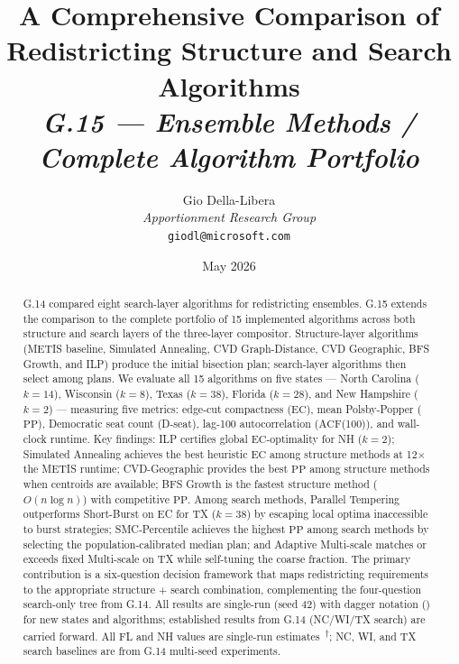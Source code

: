 \documentclass[12pt]{article}
\title{%
  \textbf{A Comprehensive Comparison of Redistricting Structure and Search
  Algorithms}\\[0.8em]
  \normalsize\textit{G.15 --- Ensemble Methods / Complete Algorithm Portfolio}%
}
\author{%
  Gio Della-Libera\\
  \textit{Apportionment Research Group}\\
  \small\texttt{giodl@microsoft.com}
}
\date{May 2026}
\newcommand{\metis}{\textsc{METIS}}
\newcommand{\ec}{\ensuremath{\mathrm{EC}}}
\newcommand{\pp}{\ensuremath{\mathrm{PP}}}
\newcommand{\acf}{\ensuremath{\mathrm{ACF}}}
\begin{document}
\maketitle

\begin{abstract}
\noindent
G.14 compared eight search-layer algorithms for redistricting ensembles.
G.15 extends the comparison to the complete portfolio of 15 implemented
algorithms across both structure and search layers of the three-layer compositor.
Structure-layer algorithms (\metis{} baseline, Simulated Annealing, CVD
Graph-Distance, CVD Geographic, BFS Growth, and ILP) produce the initial
bisection plan; search-layer algorithms then select among plans.
We evaluate all 15 algorithms on five states --- North Carolina ($k = 14$),
Wisconsin ($k = 8$), Texas ($k = 38$), Florida ($k = 28$), and New Hampshire
($k = 2$) --- measuring five metrics: edge-cut compactness (\ec{}), mean
Polsby-Popper (\pp{}), Democratic seat count (D-seat), lag-100 autocorrelation
(\acf(100)), and wall-clock runtime.
Key findings: ILP certifies global \ec{}-optimality for NH ($k = 2$);
Simulated Annealing achieves the best heuristic \ec{} among structure methods
at 12$\times$ the METIS runtime; CVD-Geographic provides the best \pp{} among
structure methods when centroids are available; BFS Growth is the fastest
structure method ($O(n \log n)$) with competitive \pp{}.
Among search methods, Parallel Tempering outperforms Short-Burst on EC for
TX ($k = 38$) by escaping local optima inaccessible to burst strategies;
SMC-Percentile achieves the highest \pp{} among search methods by selecting
the population-calibrated median plan; and Adaptive Multi-scale matches
or exceeds fixed Multi-scale on TX while self-tuning the coarse fraction.
The primary contribution is a six-question decision framework that maps
redistricting requirements to the appropriate structure + search combination,
complementing the four-question search-only tree from G.14.
All results are single-run (seed 42) with dagger notation (\dag{}) for new
states and algorithms; established results from G.14 (NC/WI/TX search) are
carried forward.
All FL and NH values are single-run estimates~\textsuperscript{$\dagger$};
NC, WI, and TX search baselines are from G.14 multi-seed experiments.
\end{abstract}

\tableofcontents
\newpage












\end{document}

